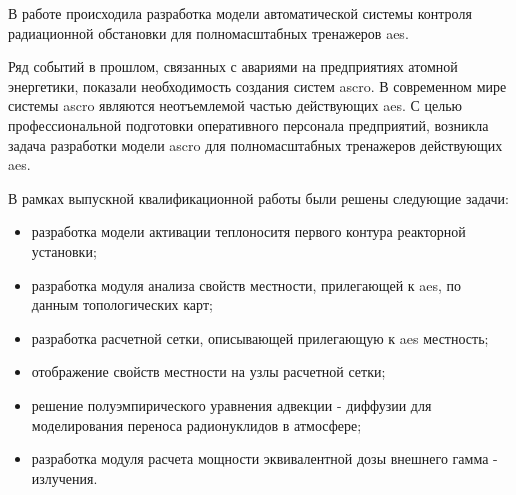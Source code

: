 
В работе происходила разработка модели автоматической системы контроля радиационной обстановки для полномасштабных 
тренажеров \ac{aes}. 

Ряд событий в прошлом, связанных с авариями на предприятиях атомной энергетики, показали необходимость создания систем 
\ac{ascro}. В современном мире системы \ac{ascro} являются неотъемлемой частью действующих \ac{aes}. С целью 
профессиональной подготовки оперативного персонала предприятий, возникла задача разработки модели 
\ac{ascro} для полномасштабных тренажеров действующих \ac{aes}.

В рамках выпускной квалификационной работы были решены следующие задачи:

\begin{itemize}
  \item разработка модели активации теплоноситя первого контура реакторной установки;
  \item разработка модуля анализа свойств местности, прилегающей к \ac{aes}, по данным топологических карт;
  \item разработка расчетной сетки, описывающей прилегающую к \ac{aes} местность;
  \item отображение свойств местности на узлы расчетной сетки;
  \item решение полуэмпирического уравнения адвекции - диффузии для моделирования переноса радионуклидов в атмосфере;
  \item разработка модуля расчета мощности эквивалентной дозы внешнего гамма - излучения.
\end{itemize}
